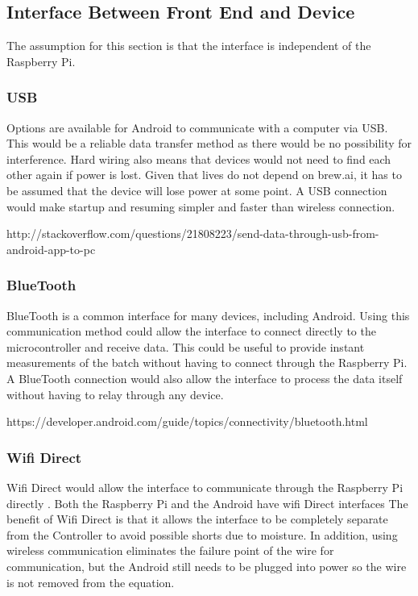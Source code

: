 \documentclass[draftclsnofoot,onecolumn,letterpaper,10pt]{IEEEtran}
\begin{document}
\subsection{Interface Between Front End and Device}
The assumption for this section is that the interface is independent of the Raspberry Pi.

\subsubsection{USB}
Options are available for Android to communicate with a computer via USB.
This would be a reliable data transfer method as there would be no possibility for interference.
Hard wiring also means that devices would not need to find each other again if power is lost.
Given that lives do not depend on brew.ai, it has to be assumed that the device will lose power at some point.
A USB connection would make startup and resuming simpler and faster than wireless connection.

http://stackoverflow.com/questions/21808223/send-data-through-usb-from-android-app-to-pc

\subsubsection{BlueTooth}
BlueTooth is a common interface for many devices, including Android.
Using this communication method could allow the interface to connect directly to the microcontroller and receive data.
This could be useful to provide instant measurements of the batch without having to connect through the Raspberry Pi.
A BlueTooth connection would also allow the interface to process the data itself without having to relay through any device.

https://developer.android.com/guide/topics/connectivity/bluetooth.html

\subsubsection{Wifi Direct}
Wifi Direct would allow the interface to communicate through the Raspberry Pi directly \cite{PiWifiDirect}.
Both the Raspberry Pi and the Android have wifi Direct interfaces \cite{AndroidWifiDirect}
The benefit of Wifi Direct is that it allows the interface to be completely separate from the Controller to avoid possible shorts due to moisture.
In addition, using wireless communication eliminates the failure point of the wire for communication, but the Android still needs to be plugged into power so the wire is not removed from the equation.
\end{document}
